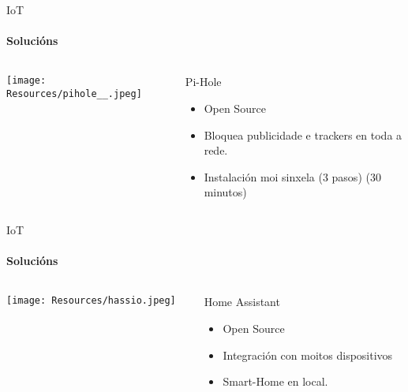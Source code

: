 \documentclass{beamer}
\begin{document}
\begin{frame}{IoT}
  \framesubtitle{Solucións}

  \begin{columns}
    \begin{column}{0.5\textwidth}
      \texttt{[image: Resources/pihole\_\_.jpeg]}

      \vspace{1cm}


    \end{column}

    \begin{column}{0.4\textwidth}
      \begin{block}{Pi-Hole}
        \begin{itemize}
          \item Open Source
          \item Bloquea publicidade e trackers en toda a rede.
          \item Instalación moi sinxela (3 pasos) (30 minutos)
        \end{itemize}
      \end{block}

    \end{column}

  \end{columns}

\end{frame}


\begin{frame}{IoT}
  \framesubtitle{Solucións}

  \begin{columns}
    \begin{column}{0.5\textwidth}
      \texttt{[image: Resources/hassio.jpeg]}

      \vspace{1cm}



    \end{column}

    \begin{column}{0.4\textwidth}
      \begin{block}{Home Assistant}
        \begin{itemize}
          \item Open Source
          \item Integración con moitos dispositivos
          \item Smart-Home en local.
        \end{itemize}
      \end{block}

    \end{column}

  \end{columns}

\end{frame}
\end{document}
